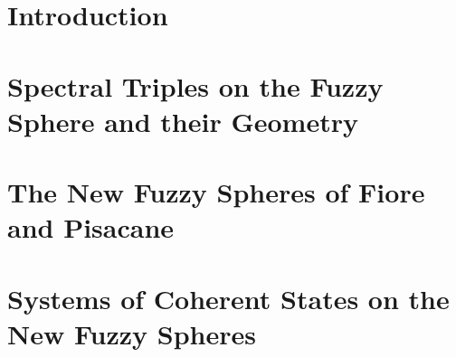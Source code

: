 \documentclass[12pt]{report}
\theoremstyle{definition}
\begin{document}




\setcounter{chapter}{0}
\chapter{Introduction}\label{chp:intro}


\chapter{Spectral Triples on the Fuzzy Sphere and their Geometry}\label{chp:fuzzysphere}


\chapter{The New Fuzzy Spheres of Fiore and Pisacane}\label{chp:NewFuzzy}


\chapter{Systems of Coherent States on the New Fuzzy Spheres}\label{chp:CHNew}

\end{document}
